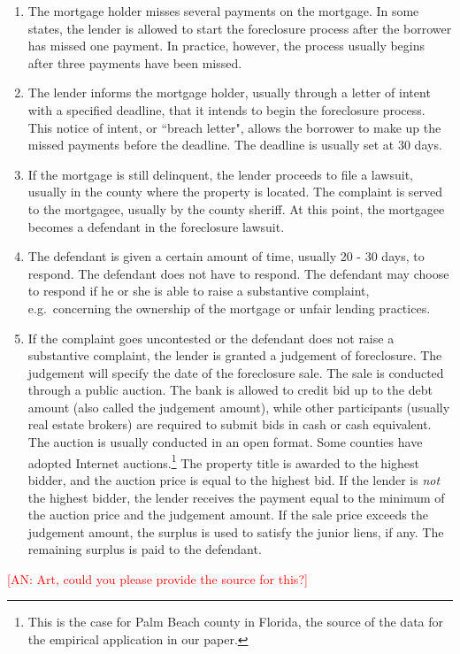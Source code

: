 \documentclass[11pt,twopage]{article}
\newcommand{\AN}[1]{\textcolor{red}{[AN: #1]}}
\begin{document}
\begin{enumerate}
\item The mortgage holder misses several payments on the mortgage. In some states, the lender is allowed to start the foreclosure process after the borrower has missed one payment. In practice, however, the process usually begins after three payments have been missed.
\item The lender informs the mortgage holder, usually through a letter of intent with a specified deadline, that it intends to begin the foreclosure process. This notice of intent, or ``breach letter", allows the borrower to make up the missed payments before the deadline. The deadline is usually set at 30 days.
\item If the mortgage is still delinquent, the lender proceeds to file a lawsuit, usually in the county where the property is located. The complaint is served to the mortgagee, usually by the county sheriff. At this point, the mortgagee becomes a defendant in the foreclosure lawsuit.
\item The defendant is given a certain amount of time, usually 20 - 30 days, to respond. The defendant does not have to  respond. The defendant may choose to respond if he or she is able to raise a substantive complaint, e.g.\ concerning the ownership of the mortgage or unfair lending practices.
\item If the complaint goes uncontested or the defendant does not raise a substantive complaint, the lender is granted a judgement of foreclosure. The judgement will specify the date of the foreclosure sale. The sale is conducted through a public auction. The bank is allowed to credit bid up to the debt amount (also called the judgement amount), while other participants (usually real estate brokers) are required to submit bids in cash or cash equivalent. The auction is usually conducted in an open format. Some counties have adopted Internet auctions.\footnote{This is the case for Palm Beach county in Florida, the source of the data for the empirical application in our paper.} The property title is awarded to the highest bidder, and the auction price is equal to the highest bid. If the lender is \emph{not} the highest bidder, the lender receives the payment equal to the minimum of the auction price and the judgement amount. If the sale price exceeds the judgement amount, the surplus is used to satisfy the junior liens, if any. The remaining surplus is paid to the defendant.\label{enum:auction}
\end{enumerate}
\AN{Art, could you please provide the source for this?}
\end{document}
